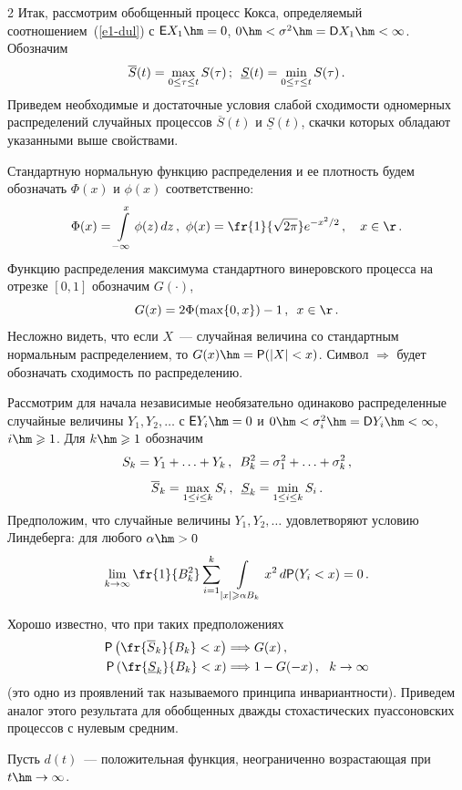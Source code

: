 \begin{multicols}{2}
Итак, рассмотрим обобщенный процесс Кокса, определяемый соотношением~(\ref{e1-dul}) 
с ${\sf E}X_1\hm=0$, $0\hm<\sigma^2\hm={\sf D}X_1\hm<\infty$. Обозначим
$$
\overline S(t)=\max\limits_{0\le\tau\le t}S(\tau)\,;\enskip \underline
S(t)=\min\limits_{0\le\tau \le t}S(\tau)\,.
$$
Приведем необходимые и достаточные условия слабой сходимости
одномерных распределений случайных процессов $\overline S(t)$ и
$\underline S(t)$, скачки которых обладают указанными выше
свойствами.

Стандартную нормальную функцию распределения и ее плотность будем
обозначать $\Phi(x)$ и $\phi(x)$ соответственно:
$$
\Phi(x)=\int\limits_{-\infty}^{x}\phi(z)\,dz\,,\ 
\phi(x)=\fr{1}{\sqrt{2\pi}}e^{-x^2/2}\,,\ \ \ x\in\r\,.
$$
Функцию распределения максимума стандартного винеровского процесса
на отрезке $[0,1]$ обозначим $G(\cdot)$,
$$
G(x)=2\Phi(\max\{0,x\})-1\,, \enskip  x\in\r\,.
$$
Несложно видеть, что если $X$~--- случайная величина со стандартным
нормальным распределением, то $G(x)\hm={\sf P}(|X|<x)$. Символ
$\Longrightarrow$ будет обозначать сходимость по распределению.

Рассмотрим для начала независимые необязательно одинаково
распределенные случайные величины $Y_1,Y_2,\ldots$ с ${\sf
E}Y_i\hm=0$ и $0\hm<\sigma^2_i\hm={\sf D}Y_i\hm<\infty$, $i\hm\geqslant 1$. Для $k\hm\geqslant
1$ обозначим
$$
S_k=Y_1+\ldots+Y_k\,, \enskip B^2_k=\sigma^2_1+\ldots+\sigma^2_k\,,
$$
$$
\overline S_k=\max\limits_{1\le i\le k}S_i\,,\enskip \underline
S_k=\min_{1\le i\le k}S_i\,.
$$
Предположим, что случайные величины $Y_1,Y_2,\ldots$ удовлетворяют
условию Линдеберга: для любого $\alpha\hm>0$
$$
\lim\limits_{k\to\infty}\fr{1}{B^2_k}\sum\limits_{i=1}^{k}\int\limits_{|x|\geqslant \alpha
B_k}^{} x^2\,d{\sf P}(Y_i<x)=0\,.
$$

Хорошо известно, что при таких предполо\-же\-ниях
\begin{align*}
{\sf P}\left(\fr{\overline S_k}{B_k}<x\right)&\Longrightarrow
G(x)\,,\\
{\sf P}\left(\fr{\underline
S_k}{B_k}<x\right)&\Longrightarrow 1-G(-x)\,,\ \ k\to\infty
\end{align*}
(это одно из проявлений так называемого принципа инвариантности).
Приведем аналог этого результата для обобщенных дважды
стохастических пуассоновских процессов с нулевым средним.

Пусть $d(t)$~--- положительная функция, неограниченно возрастающая
при $t\hm\to\infty$.

\medskip


\end{multicols}

